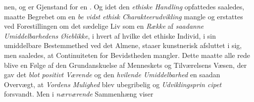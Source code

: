 nen, og er Gjenstand for en . Og idet den \emph{ethiske
Handling} opfattedes saaledes, maatte Begrebet om en \emph{be\-%
%
vidst ethisk Charakteerudvikling} mangle og erstattes
ved Forestillingen om det sædelige Liv som en \emph{Række} af
\emph{saadanne Umiddelbarhedens Øieblikke}, i hvert af
hvilke det ethiske Individ, i sin umiddelbare Bestemmethed ved
det Almene, staaer kunstnerisk afsluttet i sig, men saaledes,
at Continuiteten for Bevidstheden mangler. Dette maatte alle\-%
rede blive en Følge af den Grundanskuelse af Menneskets og
Tilværelsens Væsen, der gav det \emph{blot positivt Værende} og
den \emph{hvilende Umiddelbarhed} en saadan Overvægt, at
\emph{Vordens Mulighed} blev ubegribelig og \emph{Udviklingsprin\-%
cipet} forsvandt. Men i \emph{nærværende} Sammenhæng viser
